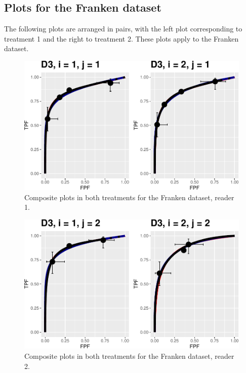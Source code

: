 \documentclass[
]{book}
\begin{document}
\hypertarget{rsm-3-fits-representative-plots-franken}{%
\subsection{Plots for the Franken dataset}\label{rsm-3-fits-representative-plots-franken}}

The following plots are arranged in pairs, with the left plot corresponding to treatment 1 and the right to treatment 2. These plots apply to the Franken dataset.

\begin{figure}
\centering
\includegraphics{12-rsm-3-fits_files/figure-latex/rsm-3-fits-plots-fr-1-1-1.pdf}
\caption{\label{fig:rsm-3-fits-plots-fr-1-1}Composite plots in both treatments for the Franken dataset, reader 1.}
\end{figure}

\begin{figure}
\centering
\includegraphics{12-rsm-3-fits_files/figure-latex/rsm-3-fits-plots-fr-1-2-1.pdf}
\caption{\label{fig:rsm-3-fits-plots-fr-1-2}Composite plots in both treatments for the Franken dataset, reader 2.}
\end{figure}
\end{document}
